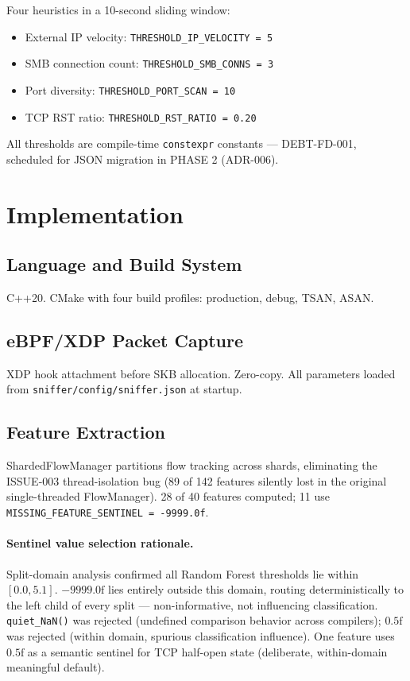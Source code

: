 \documentclass[11pt,a4paper]{article}
\begin{document}
    Four heuristics in a 10-second sliding window:

    \begin{itemize}
        \item External IP velocity: \texttt{THRESHOLD\_IP\_VELOCITY = 5}
        \item SMB connection count: \texttt{THRESHOLD\_SMB\_CONNS = 3}
        \item Port diversity: \texttt{THRESHOLD\_PORT\_SCAN = 10}
        \item TCP RST ratio: \texttt{THRESHOLD\_RST\_RATIO = 0.20}
    \end{itemize}

    All thresholds are compile-time \texttt{constexpr} constants --- DEBT-FD-001, scheduled for
    JSON migration in PHASE 2 (ADR-006).

    \section{Implementation}

    \subsection{Language and Build System}
    C++20. CMake with four build profiles: production, debug, TSAN, ASAN.

    \subsection{eBPF/XDP Packet Capture}
    XDP hook attachment before SKB allocation. Zero-copy. All parameters loaded from
    \texttt{sniffer/config/sniffer.json} at startup.

    \subsection{Feature Extraction}

    ShardedFlowManager partitions flow tracking across shards, eliminating the ISSUE-003
    thread-isolation bug (89 of 142 features silently lost in the original single-threaded
    FlowManager). 28 of 40 features computed; 11 use
    \texttt{MISSING\_FEATURE\_SENTINEL = -9999.0f}.

    \paragraph{Sentinel value selection rationale.}
    Split-domain analysis confirmed all Random Forest thresholds lie within $[0.0, 5.1]$.
    $-9999.0\text{f}$ lies entirely outside this domain, routing deterministically to the left
    child of every split --- non-informative, not influencing classification.
    \texttt{quiet\_NaN()} was rejected (undefined comparison behavior across compilers);
    $0.5\text{f}$ was rejected (within domain, spurious classification influence). One feature
    uses $0.5\text{f}$ as a semantic sentinel for TCP half-open state (deliberate,
    within-domain meaningful default).
\end{document}
